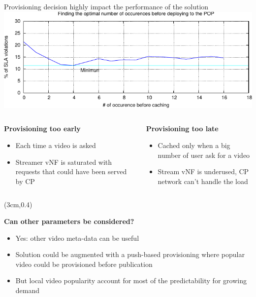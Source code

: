 \documentclass[a4paper]{beamer}
\begin{document}
\begin{frame}{Provisioning decision highly impact the performance of the solution}
	\includegraphics[width=0.90\linewidth]{cachingStrat_evaluation.pdf}
		\begin{columns}[T]
		\begin{column}[T]{0.5 \textwidth} 
		
		\textbf{Provisioning too early}
			\begin{itemize}
				\item Each time a video is asked
				\item Streamer vNF is saturated with requests that could have been served by CP
			\end{itemize}
		\end{column}
										
		\begin{column}[T]{0.5\textwidth} 
										  
			\textbf{Provisioning too late}
			\begin{itemize}
				\item Cached only when a big number of user ask for a video
				\item Stream vNF is underused, CP network can't handle the load
			\end{itemize}
			
		\end{column}
																										
	\end{columns}
	
		\begin{textblock*}{8cm}(3cm,0.4\textheight)
		\begin{alertblock}{}
			\textbf{ Can other parameters be considered? }
			\begin{itemize}
				\item Yes: other video meta-data can be useful
				\item Solution could be augmented with a push-based provisioning where popular video could be provisioned before publication
				\item But local video popularity account for most of the predictability for growing demand
			\end{itemize}
		\end{alertblock}
	\end{textblock*}		
	
\end{frame}
\end{document}
